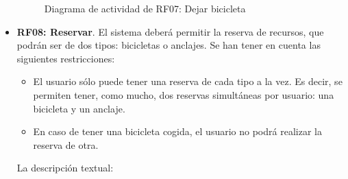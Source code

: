 \begin{itemize}
	\begin{figure}[!htb]
		\centering
		\caption{Diagrama de actividad de RF07: Dejar bicicleta}
		\label{fig:diagramaActividad_RF07}
	\end{figure}
	
	\FloatBarrier
	\item \textbf{RF08: Reservar}. El sistema deberá permitir la reserva de recursos, que podrán ser de dos tipos: bicicletas o anclajes. Se han tener en cuenta las siguientes restricciones:
	\begin{itemize}
		\item El usuario sólo puede tener una reserva de cada tipo a la vez. Es decir, se permiten tener, como mucho, dos reservas simultáneas por usuario: una bicicleta y un anclaje.
		\item En caso de tener una bicicleta cogida, el usuario no podrá realizar la reserva de otra.
	\end{itemize}
	
	La descripción textual:
	

\end{itemize}
